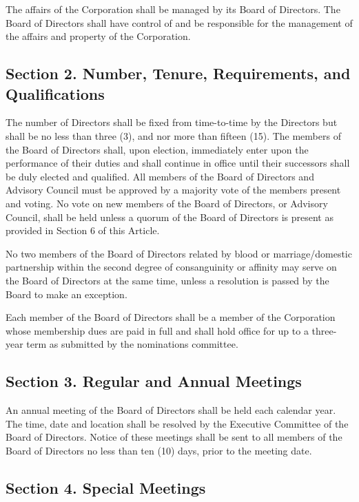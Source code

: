 \documentclass[a4paper]{article}
\begin{document}
The affairs of the Corporation shall be managed by its Board of Directors.  The Board of Directors shall have control of and be responsible for the management of the affairs and property of the Corporation.

\subsection*{Section 2. Number, Tenure, Requirements, and Qualifications}

The number of Directors shall be fixed from time-to-time by the Directors but shall be no less than three (3), and nor more than fifteen (15). The members of the Board of Directors shall, upon election, immediately enter upon the performance of their duties and shall continue in office until their successors shall be duly elected and qualified.  All members of the Board of Directors and Advisory Council must be approved by a majority vote of the members present and voting.  No vote on new members of the Board of Directors, or Advisory Council, shall be held unless a quorum of the Board of Directors is present as provided in Section 6 of this Article.

No two members of the Board of Directors related by blood or marriage/domestic partnership within the second degree of consanguinity or affinity may serve on the Board of Directors at the same time, unless a resolution is passed by the Board to make an exception.

Each member of the Board of Directors shall be a member of the Corporation whose membership dues are paid in full and shall hold office for up to a three-year term as submitted by the nominations committee.

\subsection*{Section 3. Regular and Annual Meetings}

An annual meeting of the Board of Directors shall be held each calendar year. The time, date and location shall be resolved by the Executive Committee of the Board of Directors.  Notice of these meetings shall be sent to all members of the Board of Directors no less than ten (10) days, prior to the meeting date.

\subsection*{Section 4. Special Meetings}
\end{document}
